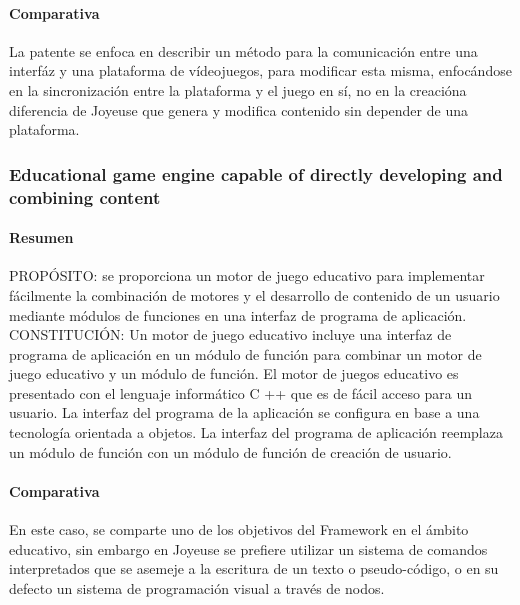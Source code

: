 \documentclass[]{article}
\begin{document}
\paragraph{Comparativa}
La patente se enfoca en describir un m\'etodo para la comunicaci\'on entre una interf\'az y una plataforma de v\'ideojuegos, para modificar esta misma, enfoc\'andose en la sincronizaci\'on entre la plataforma y el juego en s\'i, no en la creaci\'ona diferencia de Joyeuse que genera y modifica contenido sin depender de una plataforma. 
\subsubsection{Educational game engine capable of directly developing and combining content}
\paragraph{Resumen} 
PROP\'OSITO: se proporciona un motor de juego educativo para implementar f\'acilmente la combinaci\'on de motores y el desarrollo de contenido de un usuario mediante m\'odulos de funciones en una interfaz de programa de aplicaci\'on. 
\newline
\newline
CONSTITUCI\'ON: Un motor de juego educativo incluye una interfaz de programa de aplicaci\'on en un m\'odulo de funci\'on para combinar un motor de juego educativo y un m\'odulo de funci\'on. El motor de juegos educativo es presentado con el lenguaje inform\'atico C ++ que es de f\'acil acceso para un usuario. La interfaz del programa de la aplicaci\'on se configura en base a una tecnolog\'ia orientada a objetos. La interfaz del programa de aplicaci\'on reemplaza un m\'odulo de funci\'on con un m\'odulo de funci\'on de creaci\'on de usuario.
\cite{Edu}
\paragraph{Comparativa}
En este caso, se comparte uno de los objetivos del Framework en el \'ambito educativo, sin embargo en Joyeuse se prefiere utilizar un sistema de comandos interpretados que se asemeje a la escritura de un texto o pseudo-c\'odigo, o en su defecto un sistema de programaci\'on visual a trav\'es de nodos. 
\end{document}

